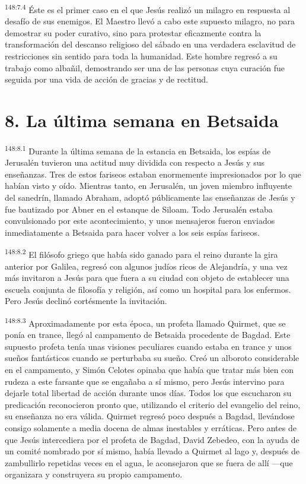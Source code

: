 \par
\textsuperscript{148:7.4} Éste es el primer caso en el que Jesús realizó un milagro en respuesta al desafío de sus enemigos. El Maestro llevó a cabo este supuesto milagro, no para demostrar su poder curativo, sino para protestar eficazmente contra la transformación del descanso religioso del sábado en una verdadera esclavitud de restricciones sin sentido para toda la humanidad. Este hombre regresó a su trabajo como albañil, demostrando ser una de las personas cuya curación fue seguida por una vida de acción de gracias y de rectitud.

\section*{8. La última semana en Betsaida}
\par
\textsuperscript{148:8.1} Durante la última semana de la estancia en Betsaida, los espías de Jerusalén tuvieron una actitud muy dividida con respecto a Jesús y sus enseñanzas. Tres de estos fariseos estaban enormemente impresionados por lo que habían visto y oído. Mientras tanto, en Jerusalén, un joven miembro influyente del sanedrín, llamado Abraham, adoptó públicamente las enseñanzas de Jesús y fue bautizado por Abner en el estanque de Siloam. Todo Jerusalén estaba convulsionado por este acontecimiento, y unos mensajeros fueron enviados inmediatamente a Betsaida para hacer volver a los seis espías fariseos.

\par
\textsuperscript{148:8.2} El filósofo griego que había sido ganado para el reino durante la gira anterior por Galilea, regresó con algunos judíos ricos de Alejandría, y una vez más invitaron a Jesús para que fuera a su ciudad con objeto de establecer una escuela conjunta de filosofía y religión, así como un hospital para los enfermos. Pero Jesús declinó cortésmente la invitación.

\par
\textsuperscript{148:8.3} Aproximadamente por esta época, un profeta llamado Quirmet, que se ponía en trance, llegó al campamento de Betsaida procedente de Bagdad. Este supuesto profeta tenía unas visiones peculiares cuando estaba en trance y unos sueños fantásticos cuando se perturbaba su sueño. Creó un alboroto considerable en el campamento, y Simón Celotes opinaba que había que tratar más bien con rudeza a este farsante que se engañaba a sí mismo, pero Jesús intervino para dejarle total libertad de acción durante unos días. Todos los que escucharon su predicación reconocieron pronto que, utilizando el criterio del evangelio del reino, su enseñanza no era válida. Quirmet regresó poco después a Bagdad, llevándose consigo solamente a media docena de almas inestables y erráticas. Pero antes de que Jesús intercediera por el profeta de Bagdad, David Zebedeo, con la ayuda de un comité nombrado por sí mismo, había llevado a Quirmet al lago y, después de zambullirlo repetidas veces en el agua, le aconsejaron que se fuera de allí ---que organizara y construyera su propio campamento.

